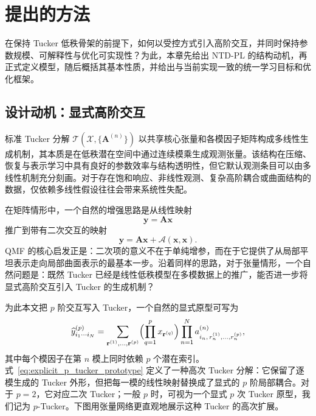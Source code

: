 \section{提出的方法}

在保持 Tucker 低秩骨架的前提下，如何以受控方式引入高阶交互，并同时保持参数规模、可解释性与优化可实现性？为此，本章先给出 NTD-PL 的结构动机，再正式定义模型，随后概括其基本性质，并给出与当前实现一致的统一学习目标和优化框架。

\subsection{设计动机：显式高阶交互}

标准 Tucker 分解 $\mathcal{T}(\mathcal{X},\{\mathbf{A}^{(n)}\})$ 以共享核心张量和各模因子矩阵构成多线性生成机制，其本质是在低秩潜在空间中通过连续模乘生成观测张量。该结构在压缩、恢复与表示学习中具有良好的参数效率与结构透明性，但它默认观测条目可以由多线性机制充分刻画。对于存在饱和响应、非线性观测、复杂高阶耦合或曲面结构的数据，仅依赖多线性假设往往会带来系统性失配。

在矩阵情形中，一个自然的增强思路是从线性映射
\begin{equation}
\mathbf y = \mathbf A\mathbf x
\end{equation}
推广到带有二次交互的映射
\begin{equation}
\label{eq:qmf_motivation}
\mathbf y = \mathbf A\mathbf x + \mathcal A(\mathbf x,\mathbf x).
\end{equation}
QMF \cite{zhai2024quadratic} 的核心启发正是：二次项的意义不在于单纯增参，而在于它提供了从局部平坦表示走向局部曲面表示的最基本一步。沿着同样的思路，对于张量情形，一个自然问题是：既然 Tucker 已经是线性低秩模型在多模数据上的推广，能否进一步将显式高阶交互引入 Tucker 的生成机制？

为此本文把 $p$ 阶交互写入 Tucker，一个自然的显式原型可写为
\begin{equation}
\label{eq:explicit_p_tucker_prototype}
\widehat y^{(p)}_{i_1\cdots i_N}
=
\sum_{\mathbf r^{(1)},\dots,\mathbf r^{(p)}}
\Bigl(\prod_{q=1}^{p} x_{\mathbf r^{(q)}}\Bigr)
\prod_{n=1}^{N}
 a^{(n)}_{i_n,\,r_n^{(1)},\dots,r_n^{(p)}},
\end{equation}
其中每个模因子在第 $n$ 模上同时依赖 $p$ 个潜在索引。式~\eqref{eq:explicit_p_tucker_prototype} 定义了一种高次 Tucker 分解：它保留了逐模生成的 Tucker 外形，但把每一模的线性映射替换成了显式的 $p$ 阶局部耦合。对于 $p=2$，它对应二次 Tucker；一般 $p$ 时，可视为一个显式 $p$ 次 Tucker 原型，我们记为 $p$-Tucker。下图用张量网络更直观地展示这种 Tucker 的高次扩展。
\begin{center}
\resizebox{\linewidth}{!}{}
\end{center}

